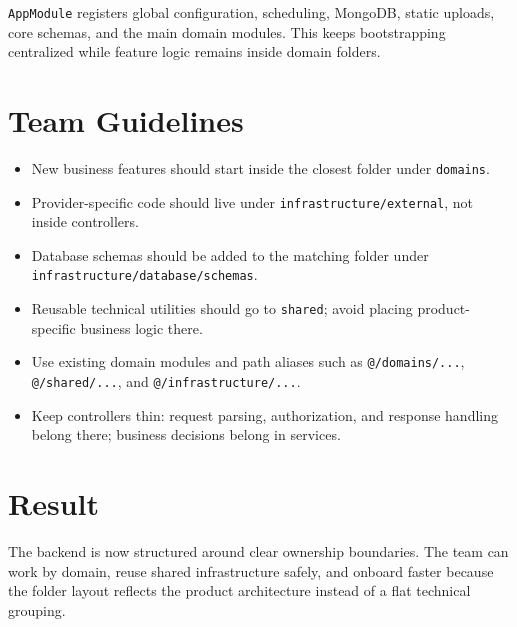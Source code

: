 \documentclass[11pt,a4paper]{article}
\begin{document}
\texttt{AppModule} registers global configuration, scheduling, MongoDB, static uploads, core schemas, and the main domain modules. This keeps bootstrapping centralized while feature logic remains inside domain folders.

\section*{Team Guidelines}

\begin{itemize}
  \item New business features should start inside the closest folder under \texttt{domains}.
  \item Provider-specific code should live under \texttt{infrastructure/external}, not inside controllers.
  \item Database schemas should be added to the matching folder under \texttt{infrastructure/database/schemas}.
  \item Reusable technical utilities should go to \texttt{shared}; avoid placing product-specific business logic there.
  \item Use existing domain modules and path aliases such as \texttt{@/domains/...}, \texttt{@/shared/...}, and \texttt{@/infrastructure/...}.
  \item Keep controllers thin: request parsing, authorization, and response handling belong there; business decisions belong in services.
\end{itemize}

\section*{Result}

The backend is now structured around clear ownership boundaries. The team can work by domain, reuse shared infrastructure safely, and onboard faster because the folder layout reflects the product architecture instead of a flat technical grouping.
\end{document}
